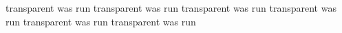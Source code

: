 transparent was run
transparent was run
transparent was run
transparent was run
transparent was run
transparent was run
